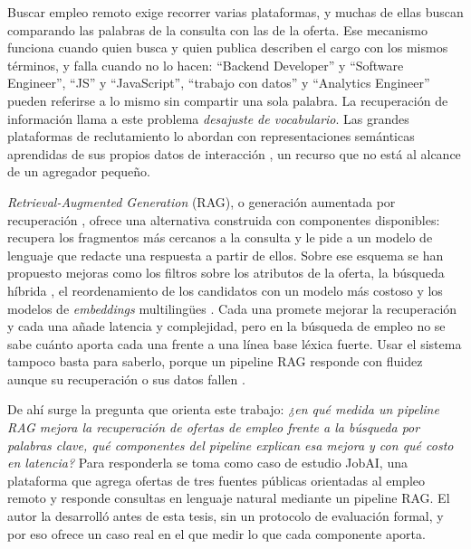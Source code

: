
Buscar empleo remoto exige recorrer varias plataformas, y muchas de ellas buscan comparando las palabras de la consulta con las de la oferta. Ese mecanismo funciona cuando quien busca y quien publica describen el cargo con los mismos términos, y falla cuando no lo hacen: \enquote{Backend Developer} y \enquote{Software Engineer}, \enquote{JS} y \enquote{JavaScript}, \enquote{trabajo con datos} y \enquote{Analytics Engineer} pueden referirse a lo mismo sin compartir una sola palabra. La recuperación de información llama a este problema \emph{desajuste de vocabulario}. Las grandes plataformas de reclutamiento lo abordan con representaciones semánticas aprendidas de sus propios datos de interacción \citep{HaThuc2017,Shen2024}, un recurso que no está al alcance de un agregador pequeño.

\textit{Retrieval-Augmented Generation} (RAG), o generación aumentada por recuperación \citep{Lewis2020}, ofrece una alternativa construida con componentes disponibles: recupera los fragmentos más cercanos a la consulta y le pide a un modelo de lenguaje que redacte una respuesta a partir de ellos. Sobre ese esquema se han propuesto mejoras como los filtros sobre los atributos de la oferta, la búsqueda híbrida \citep{Cormack2009}, el reordenamiento de los candidatos con un modelo más costoso \citep{Nogueira2019} y los modelos de \textit{embeddings} multilingües \citep{Wang2024mE5}. Cada una promete mejorar la recuperación y cada una añade latencia y complejidad, pero en la búsqueda de empleo no se sabe cuánto aporta cada una frente a una línea base léxica fuerte. Usar el sistema tampoco basta para saberlo, porque un pipeline RAG responde con fluidez aunque su recuperación o sus datos fallen \citep{Barnett2024}.

De ahí surge la pregunta que orienta este trabajo: \emph{¿en qué medida un pipeline RAG mejora la recuperación de ofertas de empleo frente a la búsqueda por palabras clave, qué componentes del pipeline explican esa mejora y con qué costo en latencia?} Para responderla se toma como caso de estudio JobAI, una plataforma que agrega ofertas de tres fuentes públicas orientadas al empleo remoto y responde consultas en lenguaje natural mediante un pipeline RAG. El autor la desarrolló antes de esta tesis, sin un protocolo de evaluación formal, y por eso ofrece un caso real en el que medir lo que cada componente aporta.

